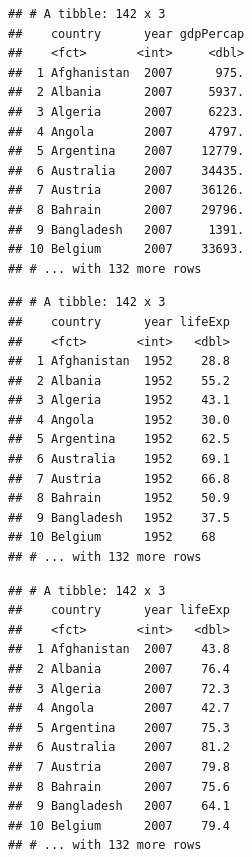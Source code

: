 \documentclass[11pt,]{article}
\newenvironment{Shaded}{\begin{snugshade}}{\end{snugshade}}
\newcommand{\KeywordTok}[1]{\textcolor[rgb]{0.13,0.29,0.53}{\textbf{#1}}}
\newcommand{\DecValTok}[1]{\textcolor[rgb]{0.00,0.00,0.81}{#1}}
\newcommand{\StringTok}[1]{\textcolor[rgb]{0.31,0.60,0.02}{#1}}
\newcommand{\OperatorTok}[1]{\textcolor[rgb]{0.81,0.36,0.00}{\textbf{#1}}}
\newcommand{\NormalTok}[1]{#1}
\begin{document}
\begin{verbatim}
## # A tibble: 142 x 3
##    country      year gdpPercap
##    <fct>       <int>     <dbl>
##  1 Afghanistan  2007      975.
##  2 Albania      2007     5937.
##  3 Algeria      2007     6223.
##  4 Angola       2007     4797.
##  5 Argentina    2007    12779.
##  6 Australia    2007    34435.
##  7 Austria      2007    36126.
##  8 Bahrain      2007    29796.
##  9 Bangladesh   2007     1391.
## 10 Belgium      2007    33693.
## # ... with 132 more rows
\end{verbatim}

\begin{Shaded}
\end{Shaded}

\begin{verbatim}
## # A tibble: 142 x 3
##    country      year lifeExp
##    <fct>       <int>   <dbl>
##  1 Afghanistan  1952    28.8
##  2 Albania      1952    55.2
##  3 Algeria      1952    43.1
##  4 Angola       1952    30.0
##  5 Argentina    1952    62.5
##  6 Australia    1952    69.1
##  7 Austria      1952    66.8
##  8 Bahrain      1952    50.9
##  9 Bangladesh   1952    37.5
## 10 Belgium      1952    68  
## # ... with 132 more rows
\end{verbatim}

\begin{Shaded}
\end{Shaded}

\begin{verbatim}
## # A tibble: 142 x 3
##    country      year lifeExp
##    <fct>       <int>   <dbl>
##  1 Afghanistan  2007    43.8
##  2 Albania      2007    76.4
##  3 Algeria      2007    72.3
##  4 Angola       2007    42.7
##  5 Argentina    2007    75.3
##  6 Australia    2007    81.2
##  7 Austria      2007    79.8
##  8 Bahrain      2007    75.6
##  9 Bangladesh   2007    64.1
## 10 Belgium      2007    79.4
## # ... with 132 more rows
\end{verbatim}
\end{document}
